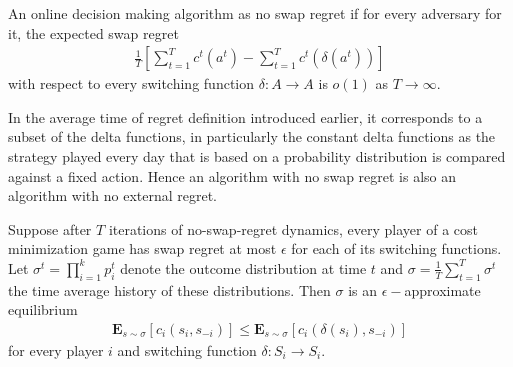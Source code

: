 \begin{defn}
An online decision making algorithm as no swap regret if for every adversary for it, the expected swap regret
\begin{align*}
\frac{1}{T}\left[\sum_{t=1}^{T}c^t(a^t)-\sum_{t=1}^{T}c^t(\delta(a^t))\right]
\end{align*}
with respect to every switching function $\delta:A \to A$ is $o(1)$ as $T \to\infty$.
\end{defn}
In the average time of regret definition introduced earlier, it corresponds to a subset of the delta functions, in particularly the constant delta functions as the strategy played every day that is based on a probability distribution is compared against a fixed action. Hence an algorithm with no swap regret is also an algorithm with no external regret.
\begin{thm}
Suppose after $T$ iterations of no-swap-regret dynamics, every player of a cost minimization game has swap regret at most $\epsilon$ for each of its switching functions. Let $\sigma^t=\prod_{i=1}^{k}p_i^t$ denote the outcome distribution at time $t$ and $\sigma = \frac{1}{T}\sum_{t=1}^{T}\sigma^t$ the time average history of these distributions. Then $\sigma$ is an $\epsilon-$approximate equilibrium 
\begin{align*}
\mathbf{E}_{s \sim \sigma}[c_i(s_i,s_{-i})] \leq \mathbf{E}_{s \sim \sigma}[c_i(\delta(s_i),s_{-i})]
\end{align*}
for every player $i$ and switching function $\delta:S_i\to S_i$.
\end{thm}


